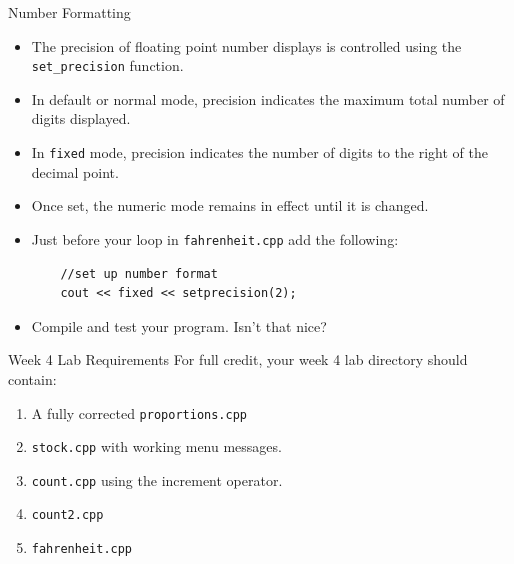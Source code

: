 \documentclass[xcolor=table]{beamer}
\begin{document}
\begin{frame}[fragile]{Number Formatting}
  \begin{itemize}[<+->]
      \item The precision of floating point number displays is controlled using the \texttt{set\_precision} function.
      \item In default or normal mode, precision indicates the maximum total number of digits displayed.
      \item In \texttt{fixed} mode, precision indicates the number of digits to the right of the decimal point.
      \item Once set, the numeric mode remains in effect until it is changed.
      \item Just before your loop in \texttt{fahrenheit.cpp} add the following:
      \begin{BVerbatim}
    //set up number format
    cout << fixed << setprecision(2);
      \end{BVerbatim}
      \item Compile and test your program.  Isn't that nice?
  \end{itemize}
\end{frame}

\begin{frame}{Week 4 Lab Requirements}
  For full credit, your week 4 lab directory should contain:
  \begin{enumerate}
    \item A fully corrected \texttt{proportions.cpp}
    \item \texttt{stock.cpp} with working menu messages.
    \item \texttt{count.cpp} using the increment operator.
    \item \texttt{count2.cpp}
    \item \texttt{fahrenheit.cpp} 
  \end{enumerate}
\end{frame}
\end{document}
